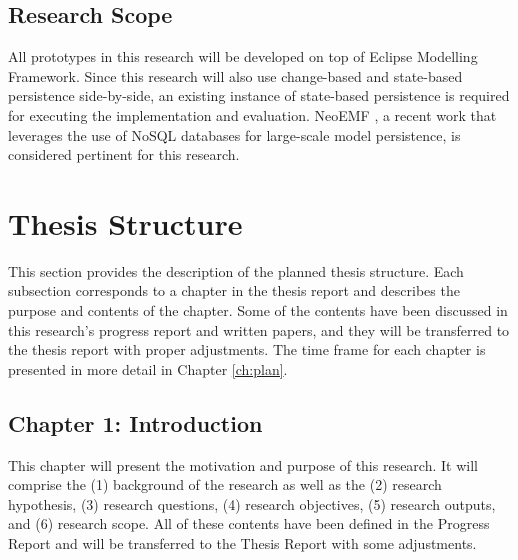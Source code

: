 \documentclass[12pt, a4paper]{report} \usepackage[titletoc]{appendix}
\begin{document}
\section{Research Scope}
\label{sec:research_scope}
All prototypes in this research will be developed on top of Eclipse Modelling Framework. Since this research will also use change-based and state-based persistence side-by-side, an existing instance of state-based persistence is required for executing the implementation and evaluation. NeoEMF \cite{daniel2016neoemf}, a recent work that leverages the use of NoSQL databases for large-scale model persistence, is considered pertinent for this research. 

\chapter{Thesis Structure}
\label{sec:Thesis Structure}
This section provides the description of the planned thesis structure. Each subsection corresponds to a chapter in the thesis report and describes the purpose and contents of the chapter. Some of the contents have been discussed in this research's progress report and written papers, and they will be transferred to the thesis report with proper adjustments. The time frame for each chapter is presented in more detail in Chapter \ref{ch:plan}.

\section{Chapter 1: Introduction}
\label{sec:chapter_1_introduction_plan}
This chapter will present the motivation and purpose of this research. It will comprise the (1) background of the research as well as the (2) research hypothesis, (3) research questions, (4) research objectives, (5) research outputs, and (6) research scope. All of these contents have been defined in the Progress Report and will be transferred to the Thesis Report with some adjustments. 

\end{document}
